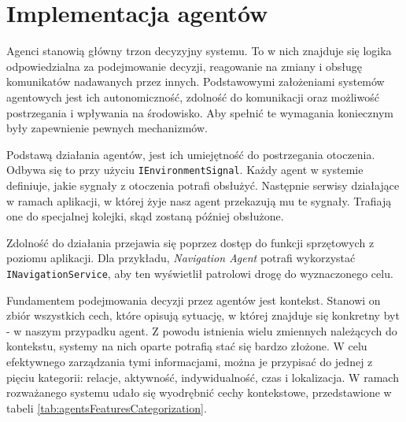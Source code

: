 \section{Implementacja agentów}
\label{sec:implementacjaAgentow} 

\par Agenci stanowią główny trzon decyzyjny systemu. To w nich znajduje się logika odpowiedzialna za podejmowanie decyzji, reagowanie na zmiany i obsługę komunikatów nadawanych przez innych. Podstawowymi założeniami systemów agentowych jest ich autonomiczność, zdolność do komunikacji oraz możliwość postrzegania i wpływania na środowisko. Aby spełnić te wymagania koniecznym były zapewnienie pewnych mechanizmów.

\par Podstawą działania agentów, jest ich umiejętność do postrzegania otoczenia. Odbywa się to przy użyciu \texttt{IEnvironmentSignal}. Każdy agent w systemie definiuje, jakie sygnały z otoczenia potrafi obsłużyć. Następnie serwisy działające w ramach aplikacji, w której żyje nasz agent przekazują mu te sygnały. Trafiają one do specjalnej kolejki, skąd zostaną później obsłużone.

\par Zdolność do działania przejawia się poprzez dostęp do funkcji sprzętowych z poziomu aplikacji. Dla przykładu, \emph{Navigation Agent} potrafi wykorzystać \texttt{INavigationService}, aby ten wyświetlił patrolowi drogę do wyznaczonego celu.


\par Fundamentem podejmowania decyzji przez agentów jest kontekst. Stanowi on zbiór wszystkich cech, które opisują sytuację, w której znajduje się konkretny byt\cite{UNDERSTANDING_AND_USING_CONTEXT} - w naszym przypadku agent. Z powodu istnienia wielu zmiennych należących do kontekstu, systemy na nich oparte potrafią stać się bardzo złożone. W celu efektywnego zarządzania tymi informacjami, można je przypisać do jednej z pięciu kategorii: relacje, aktywność, indywidualność, czas i lokalizacja\cite{AN_OPERATIONAL_DEFINITION_OF_CONTEXT}. W ramach rozważanego systemu udało się wyodrębnić cechy kontekstowe, przedstawione w tabeli \ref{tab:agentsFeaturesCategorization}.

